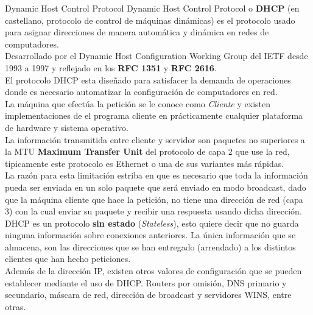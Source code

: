 \begin{frame}{Dynamic Host Control Protocol} %
    Dynamic Host Control Protocol o \textbf{DHCP} (en castellano, protocolo de
    control de máquinas dinámicas) es el protocolo usado para asignar
    direcciones de manera automática y dinámica en redes de computadores. \\[0.2cm]

    Desarrollado por el Dynamic Host Configuration Working Group del IETF desde
    1993 a 1997 y reflejado en los \textbf{RFC 1351} y \textbf{RFC 2616}. \\[0.2cm]

    El protocolo DHCP esta diseñado para satisfacer la demanda de operaciones
    donde es necesario automatizar la configuración de computadores en red. \\[0.2cm]

    La máquina que efectúa la petición se le conoce como \textit{Cliente} y
    existen implementaciones de el programa cliente en prácticamente cualquier
    plataforma de hardware y sistema operativo. \\[0.2cm]

    La información transmitida entre cliente y servidor son paquetes no
    superiores a la MTU \textbf{Maximum Transfer Unit} del protocolo de capa 2
    que use la red, tipicamente este protocolo es Ethernet o una de
    sus variantes más rápidas. \\[0.2cm]

    La razón para esta limitación estriba en que es necesario que toda la
    información pueda ser enviada en un solo paquete que será enviado en
    modo broadcast, dado que la máquina cliente que hace la petición, no tiene
    una dirección de red (capa 3) con la cual enviar su paquete y recibir una
    respuesta usando dicha dirección. \\[0.2cm]

    DHCP es un protocolo \textbf{sin estado} (\textit{Stateless}), esto quiere
    decir que no guarda ninguna información sobre conexiones anteriores. La
    única información que se almacena, son las direcciones que se han entregado
    (arrendado) a los distintos clientes que han hecho peticiones.\\[0.2cm]

    Además de la dirección IP, existen otros valores de configuración que se
    pueden establecer mediante el uso de DHCP. Routers por omisión, DNS
    primario y secundario, máscara de red, dirección de broadcast y servidores
    WINS, entre otras.\\[0.2cm]

\end{frame} 

